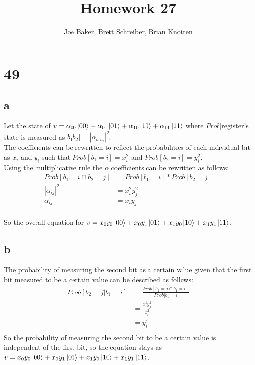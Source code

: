\documentclass[letterpaper,notitlepage,twoside]{article}
\begin{document}
\title{Homework 27}
\author{Joe Baker, Brett Schreiber, Brian Knotten}
\maketitle

\section*{49}
\subsection*{a}
Let the state of $v = \alpha_{00}\ket{00} + \alpha_{01}\ket{01} + \alpha_{10}\ket{10} + \alpha_{11}\ket{11}$ where $Prob[$register's state is measured as $b_1b_2] = |\alpha_{b_1b_2}|^2$. \\

The coefficients can be rewritten to reflect the probabilities of each individual bit as $x_i$ and $y_i$ such that $Prob[b_1 = i] = x_i^2$ and $Prob[b_2 = i] = y_i^2$. \\

Using the multiplicative rule the $\alpha$ coefficients can be rewritten as follows: \\
\begin{align*}
Prob[b_1 = i \cap b_2 = j] &= Prob[b_1 = i] * Prob[b_2 = j] \\
|\alpha_{ij}|^2 &= x_i^2y_j^2 \\
\alpha_{ij} &= x_iy_j \\
\end{align*}

So the overall equation for $v = x_0y_0\ket{00} + x_0y_1\ket{01} + x_1y_0\ket{10} + x_1y_1\ket{11}$.

\subsection*{b}
The probability of measuring the second bit as a certain value given that the first bit measured to be a certain value can be described as follows:
\begin{align*}
Prob[b_2 = j | b_1 = i] &= \frac{Prob[b_2 = j \cap b_1 = i]}{Prob[b_1 = i} \\
&= \frac{x_i^2y_j^2}{x_i^2} \\
&= y_j^2 \\
\end{align*}
So the probability of measuring the second bit to be a certain value is independent of the first bit, so the equation stays as $v = x_0y_0\ket{00} + x_0y_1\ket{01} + x_1y_0\ket{10} + x_1y_1\ket{11}$.
\end{document}
